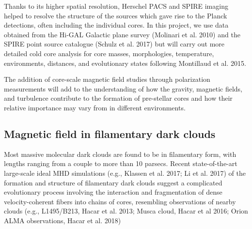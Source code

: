 \documentclass[11pt]{amsart}
\begin{document}
Thanks to its higher spatial resolution, 
Herschel PACS and SPIRE imaging
helped to resolve
the structure of the
sources which gave rise to the Planck detections, often including 
the individual cores. 
In this project, we use data obtained from the Hi-GAL Galactic
plane survey (Molinari et al. 2010) and the SPIRE point source catalogue (Schulz et al. 2017) but will carry out more detailed cold core analysis for 
core masses, morphologies, temperature, environments, distances, and evolutionary states following Montillaud et al. 2015.

The addition of core-scale magnetic field studies through polarization
measurements will add to the understanding of how the gravity, magnetic
fields, and turbulence contribute to the formation of pre-stellar cores and how their relative importance may vary from
in different environments.

\subsection{Magnetic field in filamentary dark clouds}

Most massive molecular dark clouds are found to be in filamentary form, with lengths ranging from a couple to more than 10 parsecs. 
Recent state-of-the-art large-scale ideal MHD simulations (e.g., Klassen et al. 2017; Li et al. 2017) of the formation and structure 
of filamentary dark clouds suggest a complicated evolutionary process involving the interaction and fragmentation of 
dense velocity-coherent fibers into chains of cores, resembling observations of nearby clouds (e.g., L1495/B213, Hacar et al. 2013; Musca cloud, Hacar et al 2016; 
Orion ALMA observations, Hacar et al. 2018)
\end{document}
